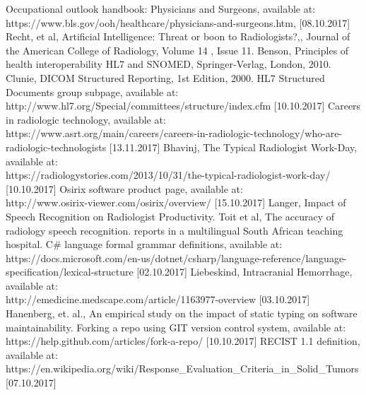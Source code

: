 \documentclass[12pt, twoside, openany]{report}
\theoremstyle{definition}
\begin{document}

\begin{thebibliography}{11}
 Occupational outlook handbook: Physicians and Surgeons, available at:\\ https://www.bls.gov/ooh/healthcare/physicians-and-surgeons.htm, [08.10.2017]
 Recht, et al, Artificial Intelligence: Threat or boon to Radiologists?,, Journal of the American College of Radiology, Volume 14 , Issue 11.
 Benson, Principles of health interoperability HL7 and SNOMED,  Springer-Verlag, London, 2010.
 Clunie, DICOM Structured Reporting, 1st Edition, 2000.
 HL7 Structured Documents group subpage, available at:\\ http://www.hl7.org/Special/committees/structure/index.cfm  [10.10.2017]
 Careers in radiologic technology, available at:\\ https://www.asrt.org/main/careers/careers-in-radiologic-technology/who-are-radiologic-technologists [13.11.2017]
Bhavinj, The Typical Radiologist Work-Day, available at: \\ https://radiologystories.com/2013/10/31/the-typical-radiologist-work-day/ [10.10.2017]
 Osirix software product page, available at:\\
http://www.osirix-viewer.com/osirix/overview/ [15.10.2017]
Langer, Impact of Speech Recognition on Radiologist Productivity.
 Toit  et al, The accuracy of radiology speech recognition.
reports in a multilingual South African teaching hospital.
 C\# language formal grammar definitions, available at:\\
https://docs.microsoft.com/en-us/dotnet/csharp/language-reference/language-specification/lexical-structure [02.10.2017]
 Liebeskind, Intracranial Hemorrhage, available at: \\ http://emedicine.medscape.com/article/1163977-overview [03.10.2017]
    Hanenberg, et. al., An empirical study on the impact of static typing on software maintainability.
 Forking a repo using GIT version control system, available at: \\ https://help.github.com/articles/fork-a-repo/ [10.10.2017]
RECIST 1.1 definition, available at:\\ https://en.wikipedia.org/wiki/Response\_Evaluation\_Criteria\_in\_Solid\_Tumors [07.10.2017]

\end{thebibliography}
\end{document}
